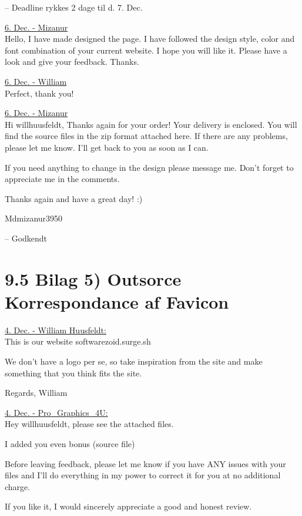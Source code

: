 \documentclass[11pt]{report}
\begin{document}
\noindent -- Deadline rykkes 2 dage til d. 7. Dec.

\noindent\underline{6. Dec. - Mizanur}\\
\noindent Hello, I have made designed the page. I have followed the design style, color and font combination of your current website. I hope you will like it. Please have a look and give your feedback. Thanks.

\noindent\underline{6. Dec. - William}\\
\noindent Perfect, thank you!

\noindent\underline{6. Dec. - Mizanur}\\
\noindent Hi willhuusfeldt,
\noindent Thanks again for your order! Your delivery is enclosed. You will find the source files in the zip format attached here. If there are any problems, please let me know. I'll get back to you as soon as I can.

\noindent If you need anything to change in the design please message me. Don't forget to appreciate me in the comments.

\noindent Thanks again and have a great day! :)

\noindent Mdmizanur3950

\noindent -- Godkendt


\newpage
\section*{9.5 Bilag 5) Outsorce Korrespondance af Favicon}


\noindent\underline{4. Dec. - William Huusfeldt:}\\
\noindent This is our website softwarezoid.surge.sh

\noindent We don't have a logo per se, so take inspiration from the site and make something that you think fits the site.

\noindent Regards, William

\noindent\underline{4. Dec. - Pro\_Graphics\_4U:}\\
\noindent Hey willhuusfeldt, please see the attached files.

\noindent I added you even bonus (source file)

\noindent Before leaving feedback, please let me know if you have ANY issues with your files and I'll do everything in my power to correct it for you at no additional charge.

\noindent If you like it, I would sincerely appreciate a good and honest review.
\end{document}
